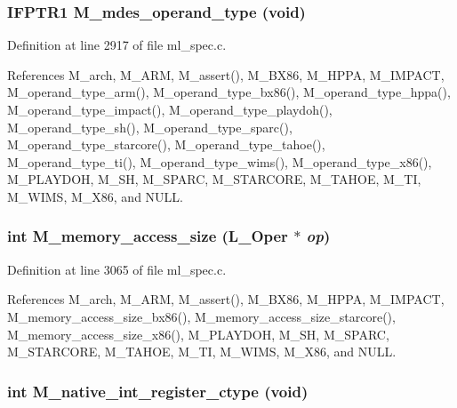 \subsubsection{\setlength{\rightskip}{0pt plus 5cm}\bf{IFPTR1} M\_\-mdes\_\-operand\_\-type (void)}\label{m__spec_8h_13803c3627820c5d987ed2a40e2e705c}




Definition at line 2917 of file ml\_\-spec.c.

References M\_\-arch, M\_\-ARM, M\_\-assert(), M\_\-BX86, M\_\-HPPA, M\_\-IMPACT, M\_\-operand\_\-type\_\-arm(), M\_\-operand\_\-type\_\-bx86(), M\_\-operand\_\-type\_\-hppa(), M\_\-operand\_\-type\_\-impact(), M\_\-operand\_\-type\_\-playdoh(), M\_\-operand\_\-type\_\-sh(), M\_\-operand\_\-type\_\-sparc(), M\_\-operand\_\-type\_\-starcore(), M\_\-operand\_\-type\_\-tahoe(), M\_\-operand\_\-type\_\-ti(), M\_\-operand\_\-type\_\-wims(), M\_\-operand\_\-type\_\-x86(), M\_\-PLAYDOH, M\_\-SH, M\_\-SPARC, M\_\-STARCORE, M\_\-TAHOE, M\_\-TI, M\_\-WIMS, M\_\-X86, and NULL.
\subsubsection{\setlength{\rightskip}{0pt plus 5cm}int M\_\-memory\_\-access\_\-size (L\_\-Oper $\ast$ {\em op})}\label{m__spec_8h_a39e37a8ef3105eb07055884444ee889}




Definition at line 3065 of file ml\_\-spec.c.

References M\_\-arch, M\_\-ARM, M\_\-assert(), M\_\-BX86, M\_\-HPPA, M\_\-IMPACT, M\_\-memory\_\-access\_\-size\_\-bx86(), M\_\-memory\_\-access\_\-size\_\-starcore(), M\_\-memory\_\-access\_\-size\_\-x86(), M\_\-PLAYDOH, M\_\-SH, M\_\-SPARC, M\_\-STARCORE, M\_\-TAHOE, M\_\-TI, M\_\-WIMS, M\_\-X86, and NULL.
\subsubsection{\setlength{\rightskip}{0pt plus 5cm}int M\_\-native\_\-int\_\-register\_\-ctype (void)}\label{m__spec_8h_8a083ae12702137e4e8eefe2e8204b54}




